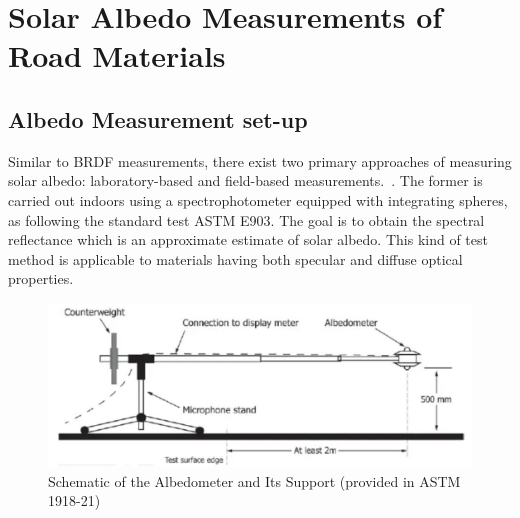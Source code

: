 \section{Solar Albedo Measurements of Road Materials}

\subsection{Albedo Measurement set-up}

Similar to BRDF measurements, there exist two primary approaches of measuring solar albedo: laboratory-based and field-based measurements.~\cite{2019_Chen}.
The former is carried out indoors using a spectrophotometer equipped with integrating spheres, as following the standard test ASTM E903.
The goal is to obtain the spectral reflectance which is an approximate estimate of solar albedo.
This kind of test method is applicable to materials having both specular and diffuse optical properties.

\begin{figure}[!tb]
    \centering
    \includegraphics[width=0.9\linewidth]{./figures/optical-properties-of-road-surface/albedometer.png}
    \caption{Schematic of the Albedometer and Its Support (provided in ASTM 1918-21)}
    \label{fig:albedometer}
\end{figure}


